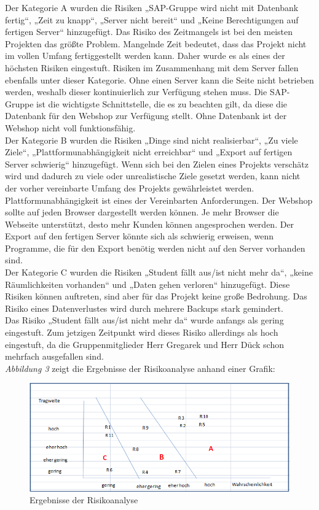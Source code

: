 Der Kategorie A wurden die Risiken „SAP-Gruppe wird nicht mit Datenbank fertig“, „Zeit zu knapp“, „Server nicht bereit“ und „Keine Berechtigungen auf fertigen Server“ hinzugefügt.  Das Risiko des Zeitmangels ist bei den meisten Projekten das größte Problem. Mangelnde Zeit bedeutet, dass das Projekt nicht im vollen Umfang fertiggestellt werden kann. Daher wurde es als eines der höchsten Risiken eingestuft. Risiken im Zusammenhang mit dem Server fallen ebenfalls unter dieser Kategorie. Ohne einen Server kann die Seite nicht betrieben werden, weshalb dieser kontinuierlich zur Verfügung stehen muss. Die SAP-Gruppe ist die wichtigste Schnittstelle, die es zu beachten gilt, da diese die Datenbank für den Webshop zur Verfügung stellt. Ohne Datenbank ist der Webshop nicht voll funktionsfähig.
\\
Der Kategorie B wurden die Risiken „Dinge sind nicht realisierbar“, „Zu viele Ziele“, „Plattformunabhängigkeit nicht erreichbar“ und „Export auf fertigen Server schwierig“ hinzugefügt. Wenn sich bei den Zielen eines Projekts verschätz wird und dadurch zu viele oder unrealistische Ziele gesetzt werden, kann nicht der vorher vereinbarte Umfang des Projekts gewährleistet werden. Plattformunabhängigkeit ist eines der Vereinbarten Anforderungen. Der Webshop sollte auf jeden Browser dargestellt werden können. Je mehr Browser die Webseite unterstützt, desto mehr Kunden können angesprochen werden. Der Export auf den fertigen Server könnte sich als schwierig erweisen, wenn Programme, die für den Export benötig werden nicht auf den Server vorhanden sind.
\\
Der Kategorie C wurden die Risiken „Student fällt aus/ist nicht mehr da“, „keine Räumlichkeiten vorhanden“ und „Daten gehen verloren“ hinzugefügt. Diese Risiken können auftreten, sind aber für das Projekt keine große Bedrohung. Das Risiko eines Datenverlustes wird durch mehrere Backups stark gemindert.
\\
Das Risiko „Student fällt aus/ist nicht mehr da“ wurde anfangs als gering eingestuft.  Zum jetzigen Zeitpunkt wird dieses Risiko allerdings als hoch eingestuft, da die Gruppenmitglieder Herr Gregarek und Herr Dück schon mehrfach ausgefallen sind.
\\
\textit{Abbildung 3} zeigt die Ergebnisse der Risikoanalyse anhand einer Grafik:

\begin{figure}[H] 
  \centering
     \includegraphics[width=15cm]{Bilder/Risikoanalyse2.png}
  \caption{Ergebnisse der Risikoanalyse}
  \label{fig:Abbildung 3}
\end{figure}

